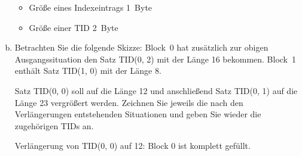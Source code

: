 \begin{enumerate}[a)]
\begin{beamerText}
\pagebreak
\begin{itemize}
	\item Größe eines Indexeintrags 1~Byte
	\item Größe einer TID 2~Byte
	\end{itemize}
\end{beamerText}

	\item \label{TIDVerlaengerung} Betrachten Sie die folgende Skizze: Block~0 hat zusätzlich zur obigen Ausgangssituation den Satz TID(0, 2) mit der Länge 16 bekommen. Block~1 enthält Satz TID(1, 0) mit der Länge 8.

	Satz TID(0, 0) soll auf die Länge 12 und anschließend Satz TID(0, 1) auf die Länge 23 vergrößert  werden. Zeichnen Sie jeweils die nach den Verlängerungen entstehenden Situationen und geben Sie wieder die zugehörigen TIDs an.

	\begin{center}
	\end{center}

	\begin{solution}
	Verlängerung von TID(0, 0) auf 12: Block 0 ist komplett gefüllt.
	\begin{center}
\end{center}
\end{solution}
\end{enumerate}
